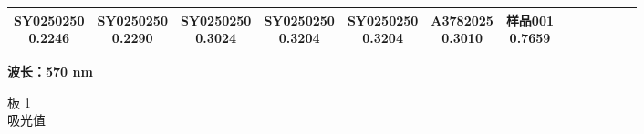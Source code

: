 \documentclass[UTF8,10pt,a4paper,fontset=fandol]{ctexart}
\begin{document}
\begin{center}
\begin{tabular}{|c|c|c|c|c|c|c|c|c|c|c|c|c|}
\shortstack{SY0250250\\0.2246} & \shortstack{SY0250250\\0.2290} &
\shortstack{SY0250250\\0.3024} & \shortstack{SY0250250\\0.3204} &
\shortstack{SY0250250\\0.3204} & \shortstack{A3782025\\0.3010} &
\shortstack{样品001\\0.7659} & \\
\hline
\end{tabular}
\end{center}

\medskip
\noindent\textbf{波长：570 nm}

\medskip
\noindent 板 1\\
吸光值
\end{document}
